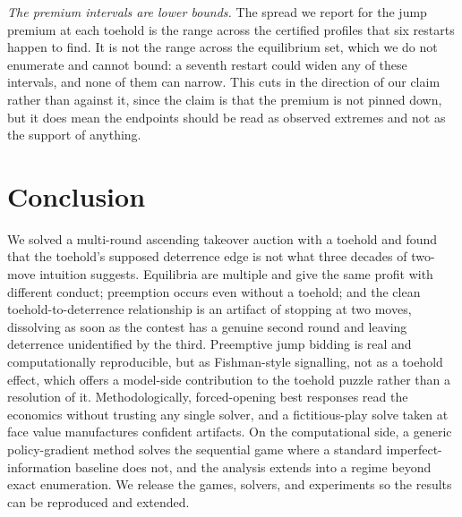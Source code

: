 \documentclass[11pt,a4paper]{article}
\begin{document}
\emph{The premium intervals are lower bounds.} The spread we report for the jump premium at each toehold is the range across the certified profiles that six restarts happen to find. It is not the range across the equilibrium set, which we do not enumerate and cannot bound: a seventh restart could widen any of these intervals, and none of them can narrow. This cuts in the direction of our claim rather than against it, since the claim is that the premium is not pinned down, but it does mean the endpoints should be read as observed extremes and not as the support of anything.

\section{Conclusion}

We solved a multi-round ascending takeover auction with a toehold and found that the toehold's supposed deterrence edge is not what three decades of two-move intuition suggests. Equilibria are multiple and give the same profit with different conduct; preemption occurs even without a toehold; and the clean toehold-to-deterrence relationship is an artifact of stopping at two moves, dissolving as soon as the contest has a genuine second round and leaving deterrence unidentified by the third. Preemptive jump bidding is real and computationally reproducible, but as Fishman-style signalling, not as a toehold effect, which offers a model-side contribution to the toehold puzzle rather than a resolution of it. Methodologically, forced-opening best responses read the economics without trusting any single solver, and a fictitious-play solve taken at face value manufactures confident artifacts. On the computational side, a generic policy-gradient method solves the sequential game where a standard imperfect-information baseline does not, and the analysis extends into a regime beyond exact enumeration. We release the games, solvers, and experiments so the results can be reproduced and extended.



\end{document}
